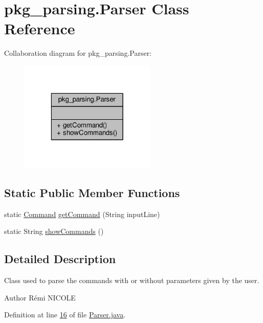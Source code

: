 \hypertarget{classpkg__parsing_1_1Parser}{\section{pkg\-\_\-parsing.\-Parser Class Reference}
\label{classpkg__parsing_1_1Parser}
}


Collaboration diagram for pkg\-\_\-parsing.\-Parser\-:
\nopagebreak
\begin{figure}[H]
\begin{center}
\leavevmode
\includegraphics[width=184pt]{classpkg__parsing_1_1Parser__coll__graph}
\end{center}
\end{figure}
\subsection*{Static Public Member Functions}
\begin{DoxyCompactItemize}
\item 
static \hyperlink{classpkg__commands_1_1Command}{Command} \hyperlink{classpkg__parsing_1_1Parser_a3baac59980671aeb689ca25fba64e9cc}{get\-Command} (String input\-Line)
\item 
static String \hyperlink{classpkg__parsing_1_1Parser_a31545cdbdb409aaeb727289c0ea7be1b}{show\-Commands} ()
\end{DoxyCompactItemize}


\subsection{Detailed Description}
Class used to parse the commands with or without parameters given by the user. \begin{DoxyAuthor}{Author}
Rémi N\-I\-C\-O\-L\-E 
\end{DoxyAuthor}


Definition at line \hyperlink{Parser_8java_source_l00016}{16} of file \hyperlink{Parser_8java_source}{Parser.\-java}.



